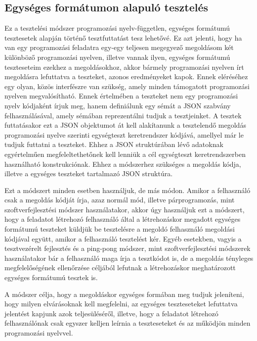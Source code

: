\documentclass{elteikthesis}
\begin{document}
			\subsection{Egységes formátumon alapuló tesztelés}
				Ez a tesztelési módszer programozási nyelv-független, egységes formátumú tesztesetek alapján történő tesztfuttatást tesz lehetővé. Ez azt jelenti, hogy ha van egy programozási feladatra egy-egy teljesen megegyező megoldásom két különböző programozási nyelven, illetve vannak ilyen, egységes formátumú teszteseteim ezekhez a megoldásokhoz, akkor bármely programozási nyelven írt megoldásra lefuttatva a teszteket, azonos eredményeket kapok. Ennek eléréséhez egy olyan, közös interfészre van szükség, amely minden támogatott programozási nyelven megvalósítható. Ennek értelmében a teszteket nem egy programozási nyelv kódjaként írjuk meg, hanem definiálunk egy sémát a JSON szabvány felhasználásával, amely sémában reprezentálni tudjuk a tesztjeinket. A tesztek futtatásakor ezt a JSON objektumot át kell alakítanunk a tesztelendő megoldás programozási nyelve szerinti egységteszt keretrendszer kódjává, amellyel már le tudjuk futtatni a teszteket. Ehhez a JSON struktúrában lévő adatoknak egyértelműen megfeleltethetőnek kell lenniük a cél egységteszt keretrendszerben használható konstrukciónak. Ehhez a módszerhez szükséges a megoldás kódja, illetve a egységes teszteket tartalmazó JSON struktúra.
				
				Ezt a módszert minden esetben használjuk, de más módon. Amikor a felhasználó csak a megoldás kódját írja, azaz normál mód, illetve párprogramozás, mint szoftverfejlesztési módszer használatakor, akkor úgy használjuk ezt a módszert, hogy a feladatot létrehozó felhasználó által a létrehozáskor megadott egységes formátumú teszteket küldjük be tesztelésre a megoldó felhasználó megoldási kódjával együtt, amikor a felhasználó tesztelést kér. Egyéb esetekben, vagyis a tesztvezérelt fejlesztés és a ping-pong módszer, mint szoftverfejlesztési módszerek használatakor bár a felhasználó maga írja a tesztkódot is, de a megoldás tényleges megfelelőségének ellenőrzése céljából lefutnak a létrehozáskor meghatározott egységes formátumú tesztek is.
				
				A módszer célja, hogy a megoldáskor egységes formában meg tudjuk jeleníteni, hogy milyen elvárásoknak kell megfelelni, az egységes teszteseteket lefuttatva jelentést kapjunk azok teljesüléséről, illetve, hogy a feladatot létrehozó felhasználónak csak egyszer kelljen leírnia a teszteseteket és az működjön minden programozási nyelvvel.
\end{document}
